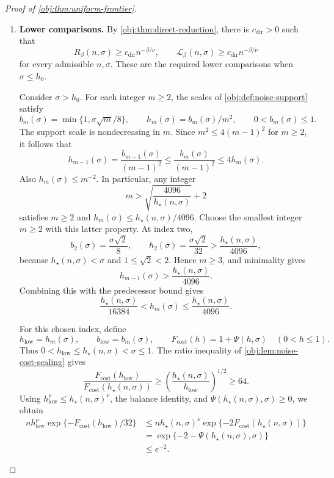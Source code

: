 \begin{proof}[Proof of \cref{obj:thm:uniform-frontier}]
\begin{enumerate}
\item \textbf{Lower comparisons.}
By \cref{obj:thm:direct-reduction}, there is \(c_{\mathrm{dir}}>0\) such that
\[
R_\beta(n,\sigma)\ge c_{\mathrm{dir}}n^{-\beta/\nu},
\qquad
\mathcal L_\beta(n,\sigma)\ge c_{\mathrm{dir}}n^{-\beta/\nu}
\]
for every admissible \(n,\sigma\). These are the required lower comparisons when
\(\sigma\le h_0\).

Consider \(\sigma>h_0\). For each integer \(m\ge2\), the scales of
\cref{obj:def:noise-support} satisfy
\[
b_m(\sigma)=\min\{1,\sigma\sqrt m/8\},
\qquad
h_m(\sigma)=b_m(\sigma)/m^2,
\qquad
0<b_m(\sigma)\le1.
\]
The support scale is nondecreasing in \(m\). Since
\(m^2\le4(m-1)^2\) for \(m\ge2\), it follows that
\[
h_{m-1}(\sigma)
=\frac{b_{m-1}(\sigma)}{(m-1)^2}
\le\frac{b_m(\sigma)}{(m-1)^2}
\le4h_m(\sigma).
\]
Also \(h_m(\sigma)\le m^{-2}\). In particular, any integer
\[
m>\sqrt{\frac{4096}{h_\star(n,\sigma)}}+2
\]
satisfies \(m\ge2\) and \(h_m(\sigma)\le h_\star(n,\sigma)/4096\).
Choose the smallest integer \(m\ge2\) with this latter property. At index two,
\[
b_2(\sigma)=\frac{\sigma\sqrt2}{8},
\qquad
h_2(\sigma)=\frac{\sigma\sqrt2}{32}
>\frac{h_\star(n,\sigma)}{4096},
\]
because \(h_\star(n,\sigma)<\sigma\) and
\(1\le\sqrt2<2\). Hence \(m\ge3\), and minimality gives
\[
h_{m-1}(\sigma)>\frac{h_\star(n,\sigma)}{4096}.
\]
Combining this with the predecessor bound gives
\[
\frac{h_\star(n,\sigma)}{16384}
<h_m(\sigma)
\le\frac{h_\star(n,\sigma)}{4096}.
\]

For this chosen index, define
\[
h_{\mathrm{low}}=h_m(\sigma),\qquad
b_{\mathrm{low}}=b_m(\sigma),\qquad
F_{\mathrm{cost}}(h)=1+\Psi(h,\sigma)\quad(0<h\le1).
\]
Thus \(0<h_{\mathrm{low}}\le h_\star(n,\sigma)<\sigma\le1\).
The ratio inequality of \cref{obj:lem:noise-cost-scaling} gives
\[
\frac{F_{\mathrm{cost}}(h_{\mathrm{low}})}
     {F_{\mathrm{cost}}(h_\star(n,\sigma))}
\ge
\left(\frac{h_\star(n,\sigma)}{h_{\mathrm{low}}}\right)^{1/2}
\ge64.
\]
Using \(h_{\mathrm{low}}^\nu\le h_\star(n,\sigma)^\nu\), the balance identity, and
\(\Psi(h_\star(n,\sigma),\sigma)\ge0\), we obtain
\[
\begin{aligned}
n h_{\mathrm{low}}^\nu
 \exp\{-F_{\mathrm{cost}}(h_{\mathrm{low}})/32\}
&\le
n h_\star(n,\sigma)^\nu
 \exp\{-2F_{\mathrm{cost}}(h_\star(n,\sigma))\}\\
&=\exp\{-2-\Psi(h_\star(n,\sigma),\sigma)\}\\
&\le e^{-2}.
\end{aligned}
\]


\end{enumerate}
\end{proof}
